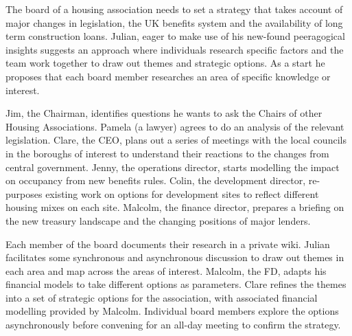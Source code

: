 %
The board of a housing association needs to set a strategy that takes
account of major changes in legislation, the UK benefits system and the
availability of long term construction loans. Julian, eager to make use
of his new-found peeragogical insights suggests an approach where
individuals research specific factors and the team work together to draw
out themes and strategic options. As a start he proposes that each board
member researches an area of specific knowledge or interest.

Jim, the Chairman, identifies questions he wants to ask the Chairs of
other Housing Associations. Pamela (a lawyer) agrees to do an analysis
of the relevant legislation. Clare, the CEO, plans out a series of
meetings with the local councils in the boroughs of interest to
understand their reactions to the changes from central government.
Jenny, the operations director, starts modelling the impact on occupancy
from new benefits rules. Colin, the development director, re-purposes
existing work on options for development sites to reflect different
housing mixes on each site. Malcolm, the finance director, prepares a
briefing on the new treasury landscape and the changing positions of
major lenders.

Each member of the board documents their research in a private wiki.
Julian facilitates some synchronous and asynchronous discussion to draw
out themes in each area and map across the areas of interest. Malcolm,
the FD, adapts his financial models to take different options as
parameters. Clare refines the themes into a set of strategic options for
the association, with associated financial modelling provided by
Malcolm. Individual board members explore the options asynchronously
before convening for an all-day meeting to confirm the strategy.
